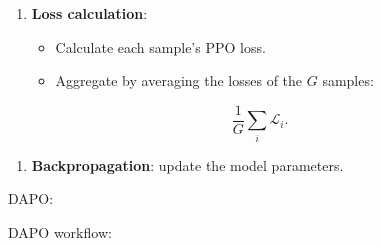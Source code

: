 \begin{enumerate}
\def\labelenumi{\arabic{enumi}.}
\setcounter{enumi}{3}
\tightlist
\item
{}
  \textbf{Loss calculation}:

  \begin{itemize}
  \tightlist
  \item
    Calculate each sample's PPO loss.
  \item
{}
    Aggregate by averaging the losses of the \(G\) samples:
  \end{itemize}
\end{enumerate}

\[
\frac{1}{G}\sum_i \mathcal{L}_i.
\]

\begin{enumerate}
\def\labelenumi{\arabic{enumi}.}
\setcounter{enumi}{4}
\tightlist
\item
  \textbf{Backpropagation}: update the model parameters.
\end{enumerate}

DAPO:

DAPO workflow:

